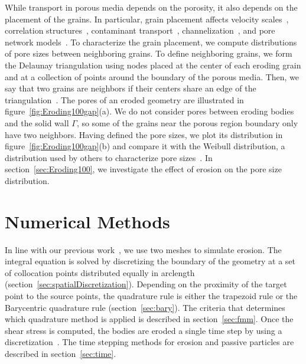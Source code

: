 \documentclass{jfm}
\begin{document}
While transport in porous media depends on the porosity, it also depends
on the placement of the grains.  In particular, grain placement affects
velocity scales~\citep{ali-par-wei-bre2017}, correlation
structures~\citep{leb-ded-dav-bou2007}, contaminant
transport~\citep{knu-car2005},
channelization~\citep{sie-ili-pri-riv-gua2019,berhanu2012shape}, and
pore network models~\citep{bry-kin-mel1993, bry-mel-cad1993,
bij-blu2006}. To characterize the grain placement, we compute
distributions of pore sizes between neighboring grains.  To define
neighboring grains, we form the Delaunay triangulation using nodes
placed at the center of each eroding grain and at a collection of points
around the boundary of the porous media.  Then, we say that two grains
are neighbors if their centers share an edge of the
triangulation~\citep{dea-qua-bir-jua2018}. The pores of an eroded
geometry are illustrated in figure~\ref{fig:Eroding100gap}(a). We do not
consider pores between eroding bodies and the solid wall $\Gamma$, so
some of the grains near the porous region boundary only have two
neighbors. Having defined the pore sizes, we plot its distribution in
figure~\ref{fig:Eroding100gap}(b) and compare it with the Weibull
distribution, a distribution used by others to characterize pore
sizes~\citep{ioa-cha1993}.  In section~\ref{sec:Eroding100}, we
investigate the effect of erosion on the pore size distribution.


\section{Numerical Methods}
\label{sec:method}
In line with our previous work~\citep{qua-moo2018}, we use two meshes to
simulate erosion. The integral equation is solved by discretizing the
boundary of the geometry at a set of collocation points distributed
equally in arclength (section~\ref{sec:spatialDiscretization}).
Depending on the proximity of the target point to the source points, the
quadrature rule is either the trapezoid rule or the Barycentric
quadrature rule (section~\ref{sec:bary}).  The criteria that determines
which quadrature method is applied is described in
section~\ref{sec:fmm}.  Once the shear stress is computed, the bodies
are eroded a single time step by using a {\thL}
discretization~\citep{hou-low-she1994, moore2013self}.  The time
stepping methods for erosion and passive particles are described in
section~\ref{sec:time}.
\end{document}
